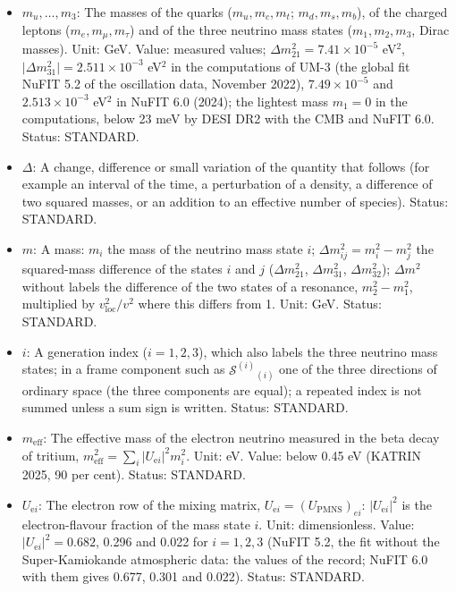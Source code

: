 \documentclass[
  10pt,
]{article}
\providecommand{\tightlist}{%
  \setlength{\itemsep}{0pt}\setlength{\parskip}{0pt}}
\begin{document}
\begin{itemize}
\tightlist
\item
  \(m_u, \dots, m_3\): The masses of the quarks (\(m_u, m_c, m_t\);
  \(m_d, m_s, m_b\)), of the charged leptons (\(m_e, m_\mu, m_\tau\))
  and of the three neutrino mass states (\(m_1, m_2, m_3\), Dirac
  masses). Unit: GeV. Value: measured values;
  \(\Delta m_{21}^2 = 7.41\times10^{-5}\) eV\(^2\),
  \(\lvert\Delta m_{31}^2\rvert = 2.511\times10^{-3}\) eV\(^2\) in the
  computations of UM-3 (the global fit NuFIT 5.2 of the oscillation
  data, November 2022), \(7.49\times10^{-5}\) and \(2.513\times10^{-3}\)
  eV\(^2\) in NuFIT 6.0 (2024); the lightest mass \(m_1 = 0\) in the
  computations, below 23 meV by DESI DR2 with the CMB and NuFIT 6.0.
  Status: STANDARD.
\item
  \(\Delta\): A change, difference or small variation of the quantity
  that follows (for example an interval of the time, a perturbation of a
  density, a difference of two squared masses, or an addition to an
  effective number of species). Status: STANDARD.
\item
  \(m\): A mass: \(m_i\) the mass of the neutrino mass state \(i\);
  \(\Delta m_{ij}^2 = m_i^2 - m_j^2\) the squared-mass difference of the
  states \(i\) and \(j\) (\(\Delta m_{21}^2\), \(\Delta m_{31}^2\),
  \(\Delta m_{32}^2\)); \(\Delta m^2\) without labels the difference of
  the two states of a resonance, \(m_2^2 - m_1^2\), multiplied by
  \(v_{\mathrm{loc}}^2/v^2\) where this differs from 1. Unit: GeV.
  Status: STANDARD.
\item
  \(i\): A generation index (\(i = 1, 2, 3\)), which also labels the
  three neutrino mass states; in a frame component such as
  \(\mathcal{S}^{(i)}{}_{(i)}\) one of the three directions of ordinary
  space (the three components are equal); a repeated index is not summed
  unless a sum sign is written. Status: STANDARD.
\item
  \(m_{\mathrm{eff}}\): The effective mass of the electron neutrino
  measured in the beta decay of tritium,
  \(m_{\mathrm{eff}}^2 = \sum_i\lvert U_{\mathrm{e}i}\rvert^2m_i^2\).
  Unit: eV. Value: below 0.45 eV (KATRIN 2025, 90 per cent). Status:
  STANDARD.
\item
  \(U_{\mathrm{e}i}\): The electron row of the mixing matrix,
  \(U_{\mathrm{e}i} = (U_{\mathrm{PMNS}})_{ei}\):
  \(\lvert U_{\mathrm{e}i}\rvert^2\) is the electron-flavour fraction of
  the mass state \(i\). Unit: dimensionless. Value:
  \(\lvert U_{\mathrm{e}i}\rvert^2 = 0.682\), 0.296 and 0.022 for
  \(i = 1, 2, 3\) (NuFIT 5.2, the fit without the Super-Kamiokande
  atmospheric data: the values of the record; NuFIT 6.0 with them gives
  0.677, 0.301 and 0.022). Status: STANDARD.
\end{itemize}
\end{document}
